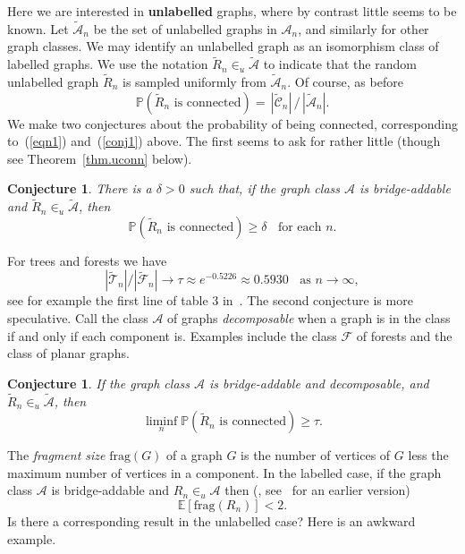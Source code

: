 \documentclass[12pt]{article}
\newcommand{\cA}{\mathcal A}
\newcommand{\cC}{\mathcal C}
\newcommand{\cF}{\mathcal F}
\newcommand{\cT}{\mathcal T}
\newcommand{\pr}{{\mathbb P}}
\newcommand{\E}{{\mathbb E}}
\newtheorem{conjecture}[theorem]{Conjecture}
\begin{document}
Here we are interested in {\bf unlabelled} graphs, where by contrast little seems to be known.
Let $\tilde{\cA}_n$ be the set of unlabelled graphs in $\cA_n$, and similarly for other graph classes.  We may identify an unlabelled graph as an isomorphism class of labelled graphs.  We use the notation $\tilde{R}_n \in_u \tilde{\cA}$ to indicate that the random unlabelled graph $\tilde{R}_n$ is sampled uniformly from $\tilde{\cA}_n$.  Of course, as before
\[ \pr(\tilde{R}_n \mbox{ is connected}) = \, |\tilde{\cC}_n| \, / \,|\tilde{\cA}_n|. \]
We make two conjectures about the probability of being connected, corresponding to~(\ref{eqn1}) and~(\ref{conj1}) above. The first seems to ask for rather little (though see Theorem~\ref{thm.uconn} below).

\begin{conjecture} \label{conj.1}
  There is a $\delta>0$ such that, if the graph class $\cA$ is bridge-addable and $\tilde{R}_n \in_u \tilde{\cA}$, then
\begin{equation} \label{eqn3}
 \pr(\tilde{R}_n \mbox{ is connected}) \geq \delta \;\; \mbox{ for each } n.
\end{equation}
\end{conjecture}
For trees and forests we have
\[ |\tilde{\cT}_n|/|\tilde{\cF}_n| \to \tau \approx e^{-0.5226} \approx  0.5930 \;\; \mbox{ as } n \to \infty,\]
see for example the first line of table 3 in~\cite{km}.
The second conjecture 
is more speculative.
Call the class $\cA$ of graphs \emph{decomposable} when a graph is in the class if and only if each component is.  Examples include the class $\cF$ of forests and the class of planar graphs.

\begin{conjecture} \label{conj.1}
  If the graph class $\cA$ is  bridge-addable and decomposable, and $\tilde{R}_n \in_u \tilde{\cA}$, then
\begin{equation} \label{eqn2}
 \liminf_n \pr(\tilde{R}_n \mbox{ is connected}) \geq \tau.
\end{equation}
\end{conjecture}

The {\em fragment size} $\mbox{frag}(G)$ of a graph $G$ is the number of vertices of $G$ less the maximum number of vertices in a component.
In the labelled case, if the graph class $\cA$ is bridge-addable and $R_n \in_u \cA$ then (\cite{cmcd2013}, see~\cite{rgmc} for an earlier version)
\[ \E[ \mbox{frag}(R_n)] <2.\]
Is there a corresponding result in the unlabelled case?   Here is an awkward example.
\end{document}
